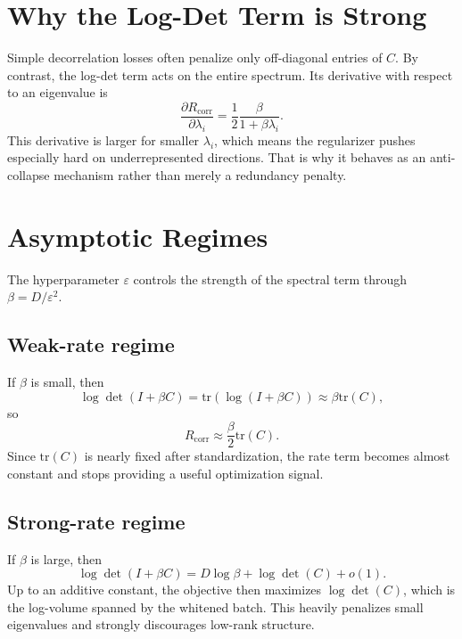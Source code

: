 \documentclass[11pt]{article}
\newcommand{\tr}{\mathrm{tr}}
\begin{document}
\section{Why the Log-Det Term is Strong}

Simple decorrelation losses often penalize only off-diagonal entries of $C$. By contrast, the log-det term acts on the entire spectrum. Its derivative with respect to an eigenvalue is
\begin{equation}
    \frac{\partial R_{\mathrm{corr}}}{\partial \lambda_i}
    =
    \frac{1}{2}\frac{\beta}{1 + \beta \lambda_i}.
\end{equation}
This derivative is larger for smaller $\lambda_i$, which means the regularizer pushes especially hard on underrepresented directions. That is why it behaves as an anti-collapse mechanism rather than merely a redundancy penalty.

\section{Asymptotic Regimes}

The hyperparameter $\varepsilon$ controls the strength of the spectral term through $\beta = D/\varepsilon^2$.

\subsection{Weak-rate regime}
If $\beta$ is small, then
\begin{equation}
    \log \det(I + \beta C)
    =
    \tr(\log(I+\beta C))
    \approx
    \beta \tr(C),
\end{equation}
so
\begin{equation}
    R_{\mathrm{corr}}
    \approx
    \frac{\beta}{2}\tr(C).
\end{equation}
Since $\tr(C)$ is nearly fixed after standardization, the rate term becomes almost constant and stops providing a useful optimization signal.

\subsection{Strong-rate regime}
If $\beta$ is large, then
\begin{equation}
    \log \det(I + \beta C)
    =
    D \log \beta + \log \det(C) + o(1).
\end{equation}
Up to an additive constant, the objective then maximizes $\log \det(C)$, which is the log-volume spanned by the whitened batch. This heavily penalizes small eigenvalues and strongly discourages low-rank structure.
\end{document}
